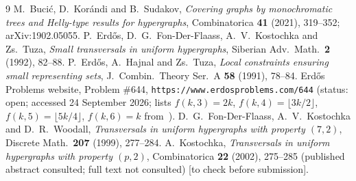 \documentclass[11pt]{amsart}
\theoremstyle{definition}
\theoremstyle{remark}
\begin{document}
\begin{thebibliography}{9}
 M.~Buci\'c, D.~Kor\'andi and B.~Sudakov, \emph{Covering graphs by monochromatic trees and Helly-type results for hypergraphs}, Combinatorica \textbf{41} (2021), 319--352; arXiv:1902.05055.
 P.~Erd\H{o}s, D.~G.~Fon-Der-Flaass, A.~V.~Kostochka and Zs.~Tuza, \emph{Small transversals in uniform hypergraphs}, Siberian Adv.\ Math.\ \textbf{2} (1992), 82--88.
 P.~Erd\H{o}s, A.~Hajnal and Zs.~Tuza, \emph{Local constraints ensuring small representing sets}, J.\ Combin.\ Theory Ser.~A \textbf{58} (1991), 78--84.
 Erd\H{o}s Problems website, Problem \#644, \texttt{https://www.erdosproblems.com/644} (status: open; accessed 24 September 2026; lists $f(k,3)=2k$, $f(k,4)=\lfloor3k/2\rfloor$, $f(k,5)=\lfloor5k/4\rfloor$, $f(k,6)=k$ from~\cite{EFKT}).
 D.~G.~Fon-Der-Flaass, A.~V.~Kostochka and D.~R.~Woodall, \emph{Transversals in uniform hypergraphs with property $(7,2)$}, Discrete Math.\ \textbf{207} (1999), 277--284.
 A.~Kostochka, \emph{Transversals in uniform hypergraphs with property $(p,2)$}, Combinatorica \textbf{22} (2002), 275--285 (published abstract consulted; full text not consulted) [to check before submission].
\end{thebibliography}
\end{document}
